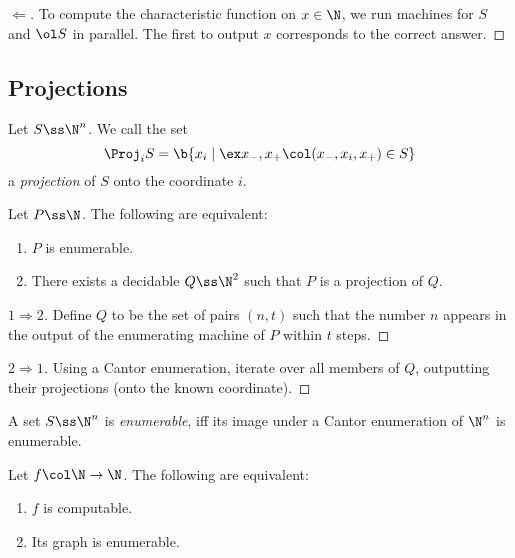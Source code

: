 \begin{proof}[$\Leftarrow$]
  To compute the characteristic function on $x \in \N$, we run machines for $S$ and $\ol S$ in parallel.
  The first to output $x$ corresponds to the correct answer.
\end{proof}

\subsection{Projections}

\begin{definition}
  Let $S \ss \N^n$. We call the set
  $$ \Proj_i S = \b{ x_i \mid \ex x_-, x_+ \col (x_-, x_i, x_+) \in S } $$
  a \emph{projection} of $S$ onto the coordinate $i$.
\end{definition}

\begin{lemma}[on projections]
  Let $P \ss \N$.
  The following are equivalent:
  \begin{enumerate}
    \item $P$ is enumerable.
    \item There exists a decidable $Q \ss \N^2$ such that $P$ is a projection of $Q$.
  \end{enumerate}  
\end{lemma}

\begin{proof}[$1 \Rightarrow 2$]
  Define $Q$ to be the set of pairs $(n, t)$ such that the number $n$ appears in the output of the enumerating machine of $P$ within $t$ steps.
\end{proof}

\begin{proof}[$2 \Rightarrow 1$]
  Using a Cantor enumeration, iterate over all members of $Q$, outputting their projections (onto the known coordinate).
\end{proof}

\begin{definition}
  A set $S \ss \N^n$ is \emph{enumerable}, iff its image under a Cantor enumeration of $\N^n$ is enumerable.
\end{definition}

\begin{lemma}[on graphs]
  Let $f \col \N \to \N$.
  The following are equivalent:
  \begin{enumerate}
    \item $f$ is computable.
    \item Its graph is enumerable.
  \end{enumerate} 
\end{lemma}

